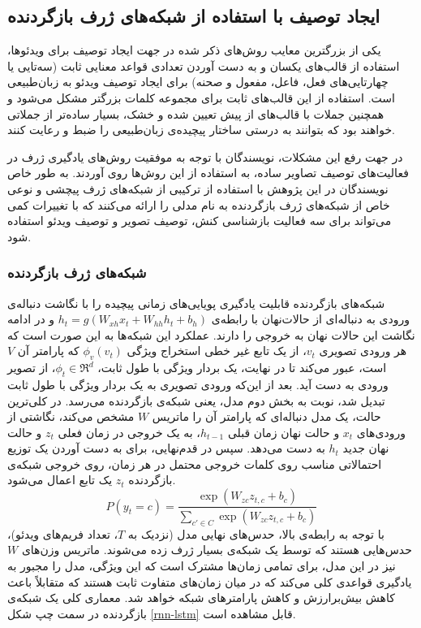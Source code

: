 \subsection{ایجاد توصیف با استفاده از شبکه‌های ژرف بازگردنده}\label{rnns}
یکی از بزرگترین معایب روش‌های ذکر شده در جهت ایجاد توصیف برای ویدئو‌ها، استفاده از قالب‌های یکسان و به دست آوردن تعدادی قواعد معنایی ثابت (سه‌تایی یا چهار‌تایی‌های فعل، فاعل، مفعول و صحنه) برای ایجاد توصیف ویدئو به زبان‌طبیعی است. استفاده از این قالب‌های ثابت برای مجموعه کلمات بزرگتر مشکل می‌شود و همچنین جملات با قالب‌های از پیش تعیین شده و خشک، بسیار ساده‌تر از جملاتی خواهند بود که بتوانند به درستی ساختار پیچیده‌ی زبان‌طبیعی را ضبط و رعایت کنند.

در جهت رفع این مشکلات، نویسندگان‌ 
\cite{Donahue2015}
با توجه به موفقیت روش‌های یادگیری ژرف در فعالیت‌های توصیف تصاویر ساده، به استفاده از این روش‌‌ها روی آوردند. به طور خاص نویسندگان در این پژوهش  با استفاده از ترکیبی از شبکه‌های ژرف پیچشی و نوعی خاص از شبکه‌های ژرف بازگردنده به نام
مدلی را ارائه می‌کنند که با تغییرات کمی می‌تواند برای سه فعالیت بازشناسی کنش، توصیف تصویر و توصیف ویدئو استفاده شود. 

\subsubsection{شبکه‌های ژرف بازگردنده} \label{about-rnns}
شبکه‌های بازگردنده قابلیت یادگیری پویایی‌‌های زمانی پیچیده را با نگاشت دنباله‌ی ورودی به دنباله‌ای از حالات‌نهان با رابطه‌ی
$ h_t = g(W_{xh}x_t‌+‌W_{hh}h_t + b_h)$
و در ادامه نگاشت این حالات نهان به خروجی را  دارند. عملکرد این شبکه‌ها به این صورت است که هر ورودی تصویری $v_t$، از یک تابع غیر خطی استخراج ویژگی $\phi_v(v_t)$‌ که پارامتر آن $V$ است، عبور می‌کند تا در نهایت، یک بردار ویژگی با طول ثابت، $\phi_t \in \Re^d$، از تصویر ورودی به دست آید. بعد از این‌که ورودی تصویری به یک بردار ویژگی با طول ثابت تبدیل شد، نوبت به بخش دوم مدل، یعنی شبکه‌ی بازگردنده می‌رسد.
در کلی‌ترین حالت، یک مدل دنباله‌ای
 که پارامتر آن را ماتریس $W$ مشخص می‌کند، نگاشتی از ورودی‌های $x_t$ و حالت نهان زمان قبلی $h_{t-1}$، به یک خروجی در زمان فعلی $z_t$ و حالت نهان جدید $h_t$ به دست می‌دهد. سپس در قدم‌نهایی، برای به دست آوردن یک توزیع احتمالاتی مناسب روی کلمات خروجی محتمل در هر زمان، روی خروجی شبکه‌ی بازگردنده $z_t$ یک تابع 
 اعمال می‌شود.
 \begin{equation*}
	 P(y_t=c) = \frac{\exp{(W_{zc}z_{t,c}‌+‌b_c)}}{\sum_{c' \in C} \exp{(W_{zc}z_{t,c}‌+‌b_c)}}
 \end{equation*}
 با توجه به رابطه‌ی بالا، حدس‌های نهایی مدل (نزدیک به $T$، تعداد فریم‌های ویدئو)، حدس‌هایی هستند که توسط یک شبکه‌ی بسیار ژرف زده می‌شوند. ماتریس وزن‌های $W$ نیز در این مدل، برای تمامی زمان‌ها مشترک است که این ویژگی، مدل را مجبور به یادگیری قواعدی کلی می‌کند که در میان زمان‌های متفاوت ثابت هستند که متقابلاً باعث کاهش بیش‌برارزش
و کاهش پارامتر‌های شبکه خواهد شد. معماری کلی یک شبکه‌ی بازگردنده در سمت چپ شکل
 \ref{rnn-lstm}
  قابل مشاهده‌ است.

